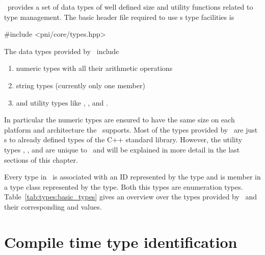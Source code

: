 \libpnicore\ provides a set of data types of well defined size and utility
functions related to type management. 
The basic header file required to use \libpnicore s type facilities is 
\begin{cppcode}
#include <pni/core/types.hpp>
\end{cppcode}
The data types provided by \libpnicore\ include
\begin{enumerate}
\item numeric types with all their arithmetic operations
\item string types (currently only one member)
\item and utility types like , , and .
\end{enumerate}
In particular the numeric types are ensured to have the same size on each
platform and architecture the \libpnicore\ supports. Most of the types provided
by \libpnicore\ are just s to already defined types of the C++
standard library. However, the utility types , , and
 are unique to \libpnicore\ and will be explained in more detail in
the last sections of this chapter.

Every type in \libpnicore\ is associated with an ID represented by the 
 type and is member in a type class represented by 
the  type. Both this types are enumeration types. 
Table~\ref{tab:types:basic_types} gives an overview over the types provided by
\libpnicore\ and their corresponding  and 
values.

\section{Compile time type identification}

